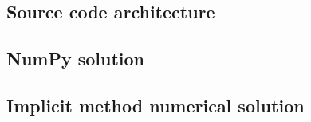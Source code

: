     \subsection{Source code architecture}
    \subsection{NumPy solution}
    \subsection{Implicit method numerical solution}
